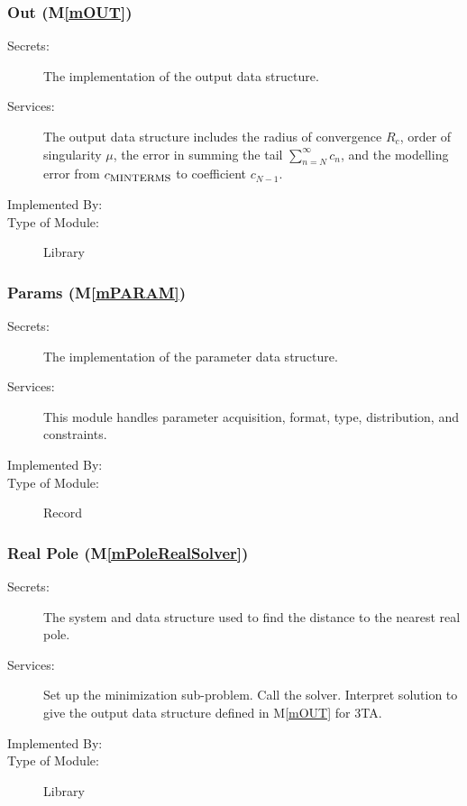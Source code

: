 \documentclass[12pt, titlepage]{article}
\newcommand{\mref}[1]{M\ref{#1}}
\begin{document}
\subsubsection{Out (\mref{mOUT})}

\begin{description}
\item[Secrets:] The implementation of the output data structure.
\item[Services:] The output data structure includes the radius of convergence $R_c$,
  order of singularity $\mu$, the error in summing the tail $\sum_{n=N}^{\infty} c_n$,
  and the modelling error from $c_{\text{\footnotesize MINTERMS}}$ to coefficient $c_{N-1}$.
\item[Implemented By:] 
\item[Type of Module:] Library
\end{description}

\subsubsection{Params (\mref{mPARAM})}

\begin{description}
\item[Secrets:] The implementation of the parameter data structure.
\item[Services:] This module handles parameter acquisition, format, type, distribution, and constraints.
\item[Implemented By:] 
\item[Type of Module:] Record
\end{description}

\subsubsection{Real Pole (\mref{mPoleRealSolver})}

\begin{description}
\item[Secrets:] The system and data structure used to find the distance to the nearest real pole.
\item[Services:] Set up the minimization sub-problem. Call the solver. Interpret
  solution to give the output data structure defined in \mref{mOUT} for 3TA.
\item[Implemented By:] 
\item[Type of Module:] Library
\end{description}
\end{document}
